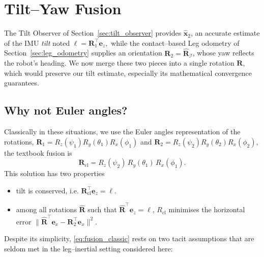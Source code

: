 \documentclass{IJCAS}
\begin{document}
\section{Tilt--Yaw Fusion}
\label{sec:axisAgnostic}

The Tilt Observer of Section~\ref{sec:tilt_observer} provides $\hat{\boldsymbol{x}}_{2}$,  an accurate
estimate of the IMU \emph{tilt} noted
\(
  \boldsymbol{\ell}=\boldsymbol{R}_{1}^{\top}\boldsymbol{e}_{z},
\)
while the contact–based Leg odometry of
Section~\ref{sec:leg_odometry} supplies an orientation \(\boldsymbol{R}_{2} = \hat{\boldsymbol{R}}_{\mathcal{I}}\), whose
yaw reflects the robot's heading.  We now merge these two pieces into a single rotation \(\boldsymbol{R}\), which would preserve our tilt estimate, especially its mathematical convergence guarantees.

\subsection{Why not Euler angles?}

Classically in these situations, we use the Euler angles representation of the rotations,
\(\boldsymbol{R}_{1}=R_{z}(\psi_{1})R_{y}(\theta_{1})R_{x}(\phi_{1})\) and
\(\boldsymbol{R}_{2}=R_{z}(\psi_{2})R_{y}(\theta_{2})R_{x}(\phi_{2})\),
the textbook fusion is
\begin{equation}
  \boldsymbol{R}_{\mathrm{cl}}
  =R_{z}(\psi_{2})\,R_{y}(\theta_{1})\,R_{x}(\phi_{1}).
  \label{eq:fusion_classic}
\end{equation}
This solution has two properties
\begin{itemize}
\item tilt is conserved, i.e. 
\(\boldsymbol{R}_{\mathrm{cl}}^{\top}\boldsymbol{e}_{z}=\boldsymbol{\ell}\).
\item among all rotations \(\hat{\boldsymbol{R}}\) such that
\(\hat{\boldsymbol{R}}^{\top}\boldsymbol{e}_{z}=\boldsymbol{\ell}\),
\(R_{\mathrm{cl}}\) minimises the horizontal error
\(
  \|
    \hat{\boldsymbol{R}}^{\top}\boldsymbol{e}_{x}-\boldsymbol{R}_{2}^{\top}\boldsymbol{e}_{x}
  \|^{2}.
\)
\end{itemize}


Despite its simplicity, \eqref{eq:fusion_classic} rests on two tacit
assumptions that are seldom met in the leg–inertial setting considered
here:
\end{document}
